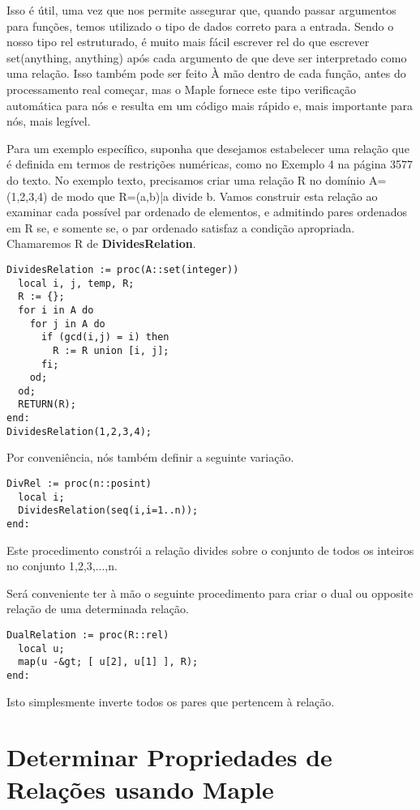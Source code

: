 \documentclass[a4paper]{article}
\begin{document}
Isso é útil, uma vez que nos permite assegurar que, quando passar argumentos para funções, temos utilizado o tipo de dados correto para a entrada. Sendo o nosso tipo rel estruturado, é muito mais fácil escrever rel do que escrever set(anything, anything) após cada argumento de que deve ser interpretado como uma relação. Isso também pode ser feito À mão dentro de cada função, antes do processamento real começar, mas o Maple fornece este tipo verificação automática para nós e resulta em um código mais rápido e, mais importante para nós, mais legível.

Para um exemplo específico, suponha que desejamos estabelecer uma relação que é definida em termos de restrições numéricas, como no Exemplo 4 na página 3577 do texto. No exemplo texto, precisamos criar uma relação R no domínio A=(1,2,3,4) de modo que R={(a,b)|a divide b}. Vamos construir esta relação ao examinar cada possível par ordenado de elementos, e admitindo pares ordenados em R se, e somente se, o par ordenado satisfaz a condição apropriada. Chamaremos R de \textbf{DividesRelation}.

\begin{lstlisting}
DividesRelation := proc(A::set(integer))
  local i, j, temp, R;
  R := {};
  for i in A do
    for j in A do
      if (gcd(i,j) = i) then
        R := R union [i, j];
      fi;
    od;
  od;
  RETURN(R);
end:
DividesRelation(1,2,3,4);
\end{lstlisting}

Por conveniência, nós também definir a seguinte variação.

\begin{lstlisting}
DivRel := proc(n::posint)
  local i;
  DividesRelation(seq(i,i=1..n));
end:
\end{lstlisting}

Este procedimento constrói a relação divides sobre o conjunto de todos os inteiros no conjunto {1,2,3,...,n}.

Será conveniente ter à mão o seguinte procedimento para criar o dual ou opposite relação de uma determinada relação.

\begin{lstlisting}
DualRelation := proc(R::rel)
  local u;
  map(u -&gt; [ u[2], u[1] ], R);
end:
\end{lstlisting}

Isto simplesmente inverte todos os pares que pertencem à relação.

\section{Determinar Propriedades de Relações usando Maple}
\end{document}
